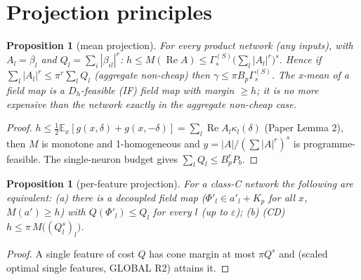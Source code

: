 \documentclass[11pt]{article}
\newtheorem{proposition}[theorem]{Proposition}
\theoremstyle{remark}
\newcommand{\E}{\mathbb E}
\newcommand{\Re}{\operatorname{Re}}
\renewcommand{\Re}{\operatorname{Re}}
\begin{document}
\section{Projection principles}
\begin{proposition}[mean projection]\label{prop:mean}
For every product network (any inputs), with $A_l=\overline{\beta_l}$ and $Q_l=\sum_i|\beta_{il}|^r$:
$h\le M(\Re A)\le\Gamma^{(S)}_s\big(\sum_l|A_l|^r\big)^s$.  Hence if $\sum_l|A_l|^r\le\pi^r\sum_lQ_l$ (\emph{aggregate non-cheap})
then $\gamma\le\pi B_p\Gamma^{(S)}_s$.  The x-mean of a field map is a $D_h$-feasible (IF) field map with margin $\ge h$; it is no
more expensive than the network exactly in the aggregate non-cheap case.
\end{proposition}
\begin{proof}
$h\le\frac12\E_x[g(x,\delta)+g(x,-\delta)]=\sum_l\Re A_l\kappa_l(\delta)$ (Paper Lemma 2), then $M$ is monotone and 1-homogeneous and
$y=|A|/(\sum|A|^r)^s$ is programme-feasible.  The single-neuron budget gives $\sum_lQ_l\le B_p^rP_b$.
\end{proof}

\begin{proposition}[per-feature projection]\label{prop:pf}
For a class-C network the following are equivalent: (a) there is a decoupled field map ($\Phi'_l\in a'_l+K_p$ for all $x$,
$M(a')\ge h$) with $Q(\Phi'_l)\le Q_l$ for every $l$ (up to $\varepsilon$); (b) (CD) $h\le\pi\,M\big((Q_l^s)_l\big)$.
\end{proposition}
\begin{proof}
A single feature of cost $Q$ has cone margin at most $\pi Q^s$ and (scaled optimal single features, GLOBAL R2) attains it.
\end{proof}
\end{document}
